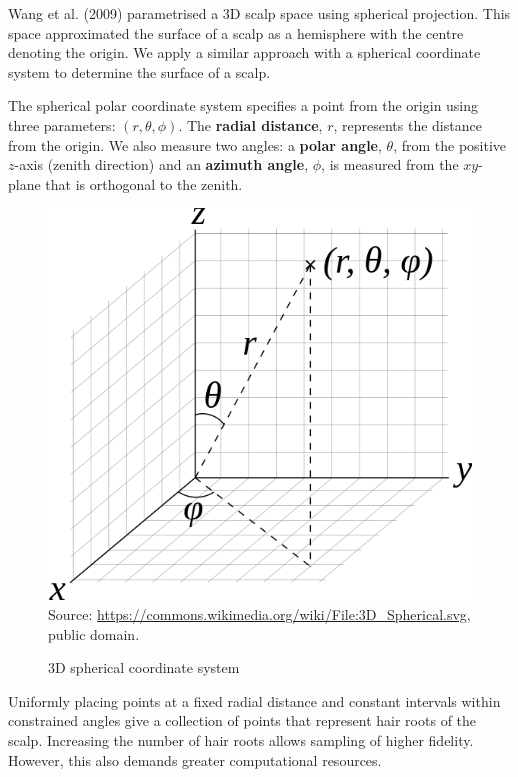 \documentclass[ %
author={Dillon Keith Diep},
supervisor={Dr. Carl Henrik Ek},
degree={MEng},
title={ART-CG:},
subtitle={Assisted Real-time Content Generation of 3D Hair by Learning Manifolds},
type={Research},
year={2017} ]{dissertation}
\begin{document}
Wang et al. (2009) parametrised a 3D scalp space using spherical projection\cite{examplebasedhair}. This space approximated the surface of a scalp as a hemisphere with the centre denoting the origin. We apply a similar approach with a spherical coordinate system to determine the surface of a scalp.

The spherical polar coordinate system specifies a point from the origin using three parameters:  $(r,\theta,\phi)$\cite[pp.123-126]{sphericalcoords}. The \textbf{radial distance}, $r$, represents the distance from the origin. We also measure two angles: a \textbf{polar angle}, $\theta$, from the positive $z$-axis (zenith direction) and an \textbf{azimuth angle}, $\phi$, is measured from the $xy$-plane that is orthogonal to the zenith.

\begin{figure}[!h]
	\centering
	\includegraphics[scale=0.25]{images/sphereCoords}\\
	\tiny{Source: \href{https://commons.wikimedia.org/wiki/File:3D_Spherical.svg}{https://commons.wikimedia.org/wiki/File:3D\_Spherical.svg}, public domain.}
	\caption{3D spherical coordinate system}
\end{figure}

Uniformly placing points at a fixed radial distance and constant intervals within constrained angles give a collection of points that represent hair roots of the scalp. Increasing the number of hair roots allows sampling of higher fidelity. However, this also demands greater computational resources.
\end{document}
